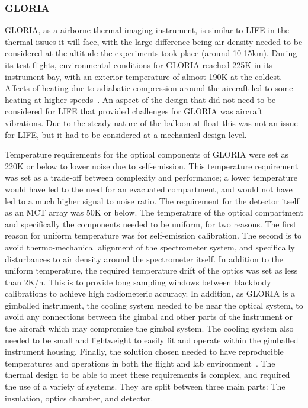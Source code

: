 \subsubsection{GLORIA}
GLORIA, as a airborne thermal-imaging instrument, is similar to LIFE in the thermal issues it will face, with the large difference being air density needed to be considered at the altitude the experiments took place (around 10-15km). During its test flights, environmental conditions for GLORIA reached 225K in its instrument bay, with an exterior temperature of almost 190K at the coldest. Affects of heating due to adiabatic compression around the aircraft led to some heating at higher speeds~\citep{GLORIA_thermalmech}. An aspect of the design that did not need to be considered for LIFE that provided challenges for GLORIA was aircraft vibrations. Due to the steady nature of the balloon at float this was not an issue for LIFE, but it had to be considered at a mechanical design level.

Temperature requirements for the optical components of GLORIA were set as 220K or below to lower noise due to self-emission. This temperature requirement was set as a trade-off between complexity and performance; a lower temperature would have led to the need for an evacuated compartment, and would not have led to a much higher signal to noise ratio. The requirement for the detector itself as an MCT array was 50K or below. The temperature of the optical compartment and specifically the components needed to be uniform, for two reasons. The first reason for uniform temperature was for self-emission calibration. The second is to avoid thermo-mechanical alignment of the spectrometer system, and specifically disturbances to air density around the spectrometer itself. In addition to the uniform temperature, the required temperature drift of the optics was set as less than 2K/h. This is to provide long sampling windows between blackbody calibrations to achieve high radiometeric accuracy. In addition, as GLORIA is a gimballed instrument, the cooling system needed to be near the optical system, to avoid any connections between the gimbal and other parts of the instrument or the aircraft which may compromise the gimbal system. The cooling system also needed to be small and lightweight to easily fit and operate within the gimballed instrument housing. Finally, the solution chosen needed to have reproducible temperatures and operations in both the flight and lab environment~\citep{GLORIA_thermalmech}. The thermal design to be able to meet these requirements is complex, and required the use of a variety of systems. They are split between three main parts: The insulation, optics chamber, and detector.

